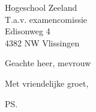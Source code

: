 \documentclass{letter}
\begin{document}
\longindentation=0pt

\begin{letter}{Hogeschool Zeeland \\ T.a.v. examencomissie \\ Edisonweg 4 \\ 4382 NW Vlissingen}

\opening{Geachte heer, mevrouw}

\closing{Met vriendelijke groet, }

\ps

\end{letter}
\end{document}
